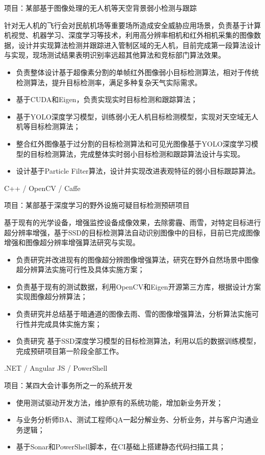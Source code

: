 \documentclass{resume}
\begin{document}
项目：某部基于图像处理的无人机等天空背景弱小检测与跟踪

针对无人机的飞行会对民航机场等重要场所造成安全威胁应用场景，负责基于计算机视觉、机器学习、深度学习等技术，利用高分辨率相机和红外相机采集的图像数据，设计并实现算法检测并跟踪进入管制区域的无人机，目前完成第一段算法设计与实现，现场测试结果表明识别率远超其他算法和竞标部门算法效果。
\begin{itemize}
  \item 负责整体设计基于超像素分割的单帧红外图像弱小目标检测算法，相对于传统检测算法，提升目标检测率，满足多种复杂天气实际需求。
  \item 基于CUDA和Eigen，负责实现实时目标检测和跟踪算法；
  \item 基于YOLO深度学习模型，训练弱小无人机目标检测模型，实现对天空域无人机等目标检测算法；
  \item 整合红外图像基于过分割的目标检测算法和可见光图像基于YOLO深度学习模型的目标检测算法，完成整体实时弱小目标检测和跟踪算法设计与实现。
  \item 设计基于Particle Filter算法，设计并实现改进表观特征的弱小目标跟踪算法。
\end{itemize}

C++ / OpenCV / Caffe

项目：某部基于深度学习的野外设施可疑目标检测预研项目

基于现有的光学设备，增强监控设备成像效果，去除雾霾、雨雪，对特定目标进行超分辨率增强，基于SSD的目标检测算法自动识别图像中的目标，目前已完成图像增强和图像超分辨率增强算法研究与实现。
\begin{itemize}
  \item 负责研究并改进现有的图像超分辨图像增强算法，研究在野外自然场景中图像超分辨算法实施可行性及具体实施方案；
  \item 负责基于现有的测试数据，利用OpenCV和Eigen开源第三方库，根据设计方案实现图像超分辨算法；
  \item 负责研究并总结基于暗通道的图像去雨、雪的图像增强算法，分析算法实施可行性并完成具体实施方案；
  \item 负责研究 基于SSD深度学习模型的目标检测算法，利用以后的数据训练模型，完成预研项目第一阶段全部工作。
\end{itemize}

.NET / Angular JS / PowerShell

项目：某四大会计事务所之一的系统开发
\begin{itemize}
  \item 使用测试驱动开发方法，维护原有的系统功能，增加新业务开发；
  \item 与业务分析师BA、测试工程师QA一起分解业务、分析业务，并与客户沟通业务逻辑；
  \item 基于Sonar和PowerShell脚本，在CI基础上搭建静态代码扫描工具；
\end{itemize}
\end{document}
